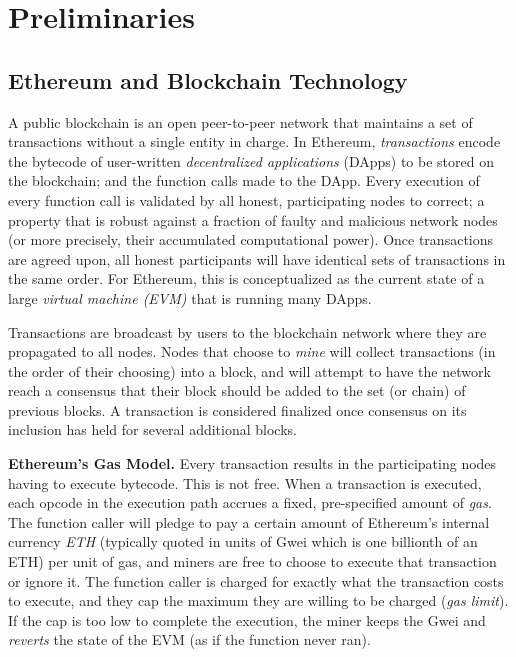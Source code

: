 
\section{Preliminaries}

\subsection{Ethereum and Blockchain Technology}

A public blockchain is an open peer-to-peer network that maintains a set of transactions without a single entity in charge. In Ethereum, \emph{transactions} encode the bytecode of user-written \emph{decentralized applications} (DApps) to be stored on the blockchain; and the function calls made to the DApp. Every execution of every function call is validated by all honest, participating nodes to correct; a property that is robust against a fraction of faulty and malicious network nodes (or more precisely, their accumulated computational power). Once transactions are agreed upon, all honest participants will have identical sets of transactions in the same order. For Ethereum, this is conceptualized as the current state of a large \emph{virtual machine (EVM)} that is running many DApps. 

Transactions are broadcast by users to the blockchain network where they are propagated to all nodes. Nodes that choose to \emph{mine} will collect transactions (in the order of their choosing) into a block, and will attempt to have the network reach a consensus that their block should be added to the set (or chain) of previous blocks. A transaction is considered finalized once consensus on its inclusion has held for several additional blocks.

\textbf{Ethereum's Gas Model.} Every transaction results in the participating nodes having to execute bytecode. This is not free. When a transaction is executed, each opcode in the execution path accrues a fixed, pre-specified amount of \emph{gas}. The function caller will pledge to pay a certain amount of Ethereum's internal currency \emph{ETH} (typically quoted in units of Gwei which is one billionth of an ETH) per unit of gas, and miners are free to choose to execute that transaction or ignore it. The function caller is charged for exactly what the transaction costs to execute, and they cap the maximum they are willing to be charged (\textit{gas limit}). If the cap is too low to complete the execution, the miner keeps the Gwei and \emph{reverts} the state of the EVM (as if the function never ran).


